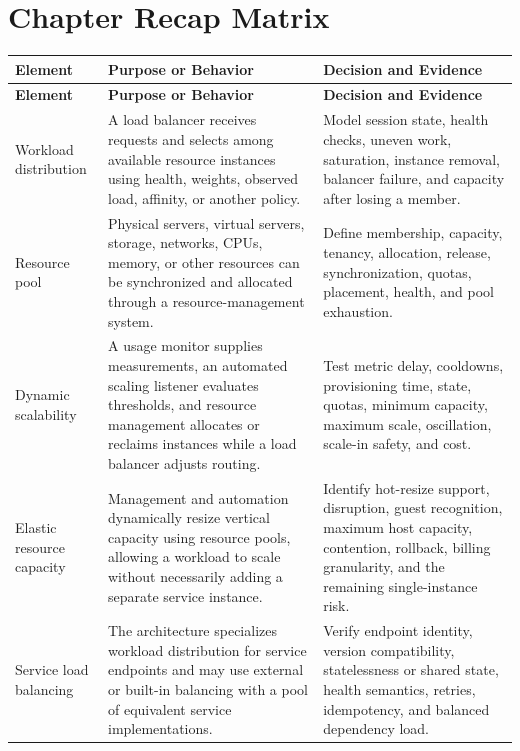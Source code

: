\documentclass[11pt]{article}
\begin{document}
\section{Chapter Recap Matrix}
\begingroup\small\setlength{\tabcolsep}{4pt}
\begin{longtable}{@{}>{\RaggedRight\arraybackslash}p{}>{\RaggedRight\arraybackslash}p{}>{\RaggedRight\arraybackslash}p{}@{}}
\toprule\rowcolor{Navy}\color{white}\textbf{Element} & \color{white}\textbf{Purpose or Behavior} & \color{white}\textbf{Decision and Evidence}\\\midrule\endfirsthead
\toprule\rowcolor{Navy}\color{white}\textbf{Element} & \color{white}\textbf{Purpose or Behavior} & \color{white}\textbf{Decision and Evidence}\\\midrule\endhead
Workload distribution & A load balancer receives requests and selects among available resource instances using health, weights, observed load, affinity, or another policy. & Model session state, health checks, uneven work, saturation, instance removal, balancer failure, and capacity after losing a member. \\\midrule
Resource pool & Physical servers, virtual servers, storage, networks, CPUs, memory, or other resources can be synchronized and allocated through a resource-management system. & Define membership, capacity, tenancy, allocation, release, synchronization, quotas, placement, health, and pool exhaustion. \\\midrule
Dynamic scalability & A usage monitor supplies measurements, an automated scaling listener evaluates thresholds, and resource management allocates or reclaims instances while a load balancer adjusts routing. & Test metric delay, cooldowns, provisioning time, state, quotas, minimum capacity, maximum scale, oscillation, scale-in safety, and cost. \\\midrule
Elastic resource capacity & Management and automation dynamically resize vertical capacity using resource pools, allowing a workload to scale without necessarily adding a separate service instance. & Identify hot-resize support, disruption, guest recognition, maximum host capacity, contention, rollback, billing granularity, and the remaining single-instance risk. \\\midrule
Service load balancing & The architecture specializes workload distribution for service endpoints and may use external or built-in balancing with a pool of equivalent service implementations. & Verify endpoint identity, version compatibility, statelessness or shared state, health semantics, retries, idempotency, and balanced dependency load. \\\midrule

\end{longtable}
\end{document}
